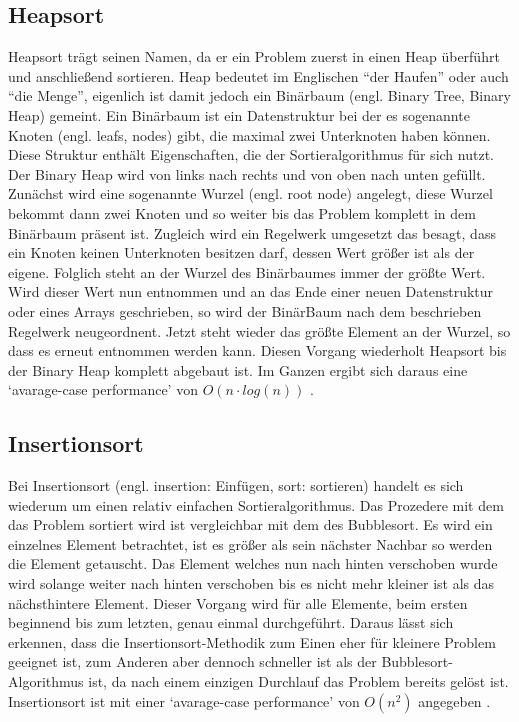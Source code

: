 \subsection{Heapsort}
Heapsort trägt seinen Namen, da er ein Problem zuerst in einen Heap überführt und anschließend sortieren. Heap bedeutet im Englischen 
"`der Haufen"'  oder auch  "`die Menge"', eigenlich ist damit jedoch ein Binärbaum (engl. Binary Tree, Binary Heap) gemeint. Ein Binärbaum 
ist ein Datenstruktur bei der es sogenannte Knoten (engl. leafs, nodes) gibt, die maximal zwei Unterknoten haben können. 
Diese Struktur enthält Eigenschaften, die der Sortieralgorithmus für sich nutzt. Der Binary Heap wird von links nach rechts und von oben nach
unten gefüllt. Zunächst wird eine sogenannte Wurzel (engl. root node) angelegt, diese Wurzel bekommt dann zwei Knoten
und so weiter bis das Problem komplett in dem Binärbaum präsent ist. Zugleich wird ein Regelwerk umgesetzt das besagt, dass ein Knoten keinen Unterknoten
besitzen darf, dessen Wert größer ist als der eigene. Folglich steht an der Wurzel des Binärbaumes immer der größte Wert. Wird dieser Wert nun entnommen und an das 
Ende einer neuen Datenstruktur oder eines Arrays geschrieben, so wird der BinärBaum nach dem beschrieben Regelwerk neugeordnent.
Jetzt steht wieder das größte Element an der Wurzel, so dass es erneut entnommen werden kann.
Diesen Vorgang wiederholt Heapsort bis der Binary Heap komplett abgebaut ist. Im Ganzen ergibt sich daraus 
eine `avarage-case performance' von $O(n\cdot log(n))$ \parencite[vgl.][]{heapsort}.

\subsection{Insertionsort}
Bei Insertionsort (engl. insertion: Einfügen, sort: sortieren) handelt es sich wiederum um einen relativ einfachen Sortieralgorithmus. Das 
Prozedere mit dem das Problem sortiert wird ist vergleichbar mit dem des Bubblesort. Es wird ein einzelnes Element betrachtet, ist es größer als sein
nächster Nachbar so werden die Element getauscht. 
Das Element welches nun nach hinten verschoben wurde wird solange weiter nach hinten verschoben bis es nicht
mehr kleiner ist als das nächsthintere Element. Dieser Vorgang wird für alle Elemente, beim ersten beginnend bis zum letzten, genau einmal durchgeführt.
Daraus lässt sich erkennen, dass die Insertionsort-Methodik zum Einen eher für
 kleinere Problem geeignet ist, zum Anderen aber dennoch schneller ist als der Bubblesort-Algorithmus ist, da nach einem einzigen Durchlauf
das Problem bereits gelöst ist. 
Insertionsort ist mit einer `avarage-case performance' von $O(n^2)$ angegeben \parencite[vgl.][]{insertionsort}.

